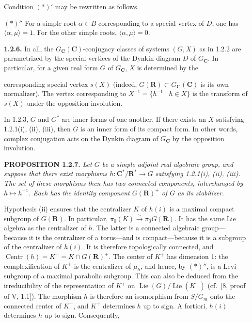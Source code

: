 \documentclass[10pt,a4paper]{article}
\newcommand{\SourcePage}[2]{\clearpage\setcounter{page}{#2}\typeout{D031_SOURCE_PAGE physical=#1 printed=#2}}
\begin{document}
Condition \((*)'\) may be rewritten as follows.

\((*)''\) For a simple root \(\alpha\in B\) corresponding to a special vertex of \(D\), one has \(\langle\alpha,\mu\rangle=1\). For the other simple roots, \(\langle\alpha,\mu\rangle=0\).

\textbf{1.2.6.} In all, the \(G_{\mathbf C}(\mathbf C)\)-conjugacy classes of systems \((G,X)\) as in 1.2.2 are parametrized by the special vertices of the Dynkin diagram \(D\) of \(G_{\mathbf C}\). In particular, for a given real form \(G\) of \(G_{\mathbf C}\), \(X\) is determined by the

\SourcePage{13}{259}
corresponding special vertex \(s(X)\) (indeed, \(G(\mathbf R)\subset G_{\mathbf C}(\mathbf C)\) is its own normalizer). The vertex corresponding to \(X^{-1}=\{h^{-1}\mid h\in X\}\) is the transform of \(s(X)\) under the opposition involution.

In 1.2.3, \(G\) and \(G^*\) are inner forms of one another. If there exists an \(X\) satisfying 1.2.1(i), (ii), (iii), then \(G\) is an inner form of its compact form. In other words, complex conjugation acts on the Dynkin diagram of \(G_{\mathbf C}\) by the opposition involution.

\textbf{PROPOSITION 1.2.7.} \emph{Let \(G\) be a simple adjoint real algebraic group, and suppose that there exist morphisms \(h:\mathbf C^*/\mathbf R^*\to G\) satisfying 1.2.1(i), (ii), (iii). The set of these morphisms then has two connected components, interchanged by \(h\mapsto h^{-1}\). Each has the identity component \(G(\mathbf R)^+\) of \(G\) as its stabilizer.}

Hypothesis (ii) ensures that the centralizer \(K\) of \(h(i)\) is a maximal compact subgroup of \(G(\mathbf R)\). In particular, \(\pi_0(K)\xrightarrow{\sim}\pi_0G(\mathbf R)\). It has the same Lie algebra as the centralizer of \(h\). The latter is a connected algebraic group---because it is the centralizer of a torus---and is compact---because it is a subgroup of the centralizer of \(h(i)\). It is therefore topologically connected, and \(\operatorname{Centr}(h)=K^+=K\cap G(\mathbf R)^+\). The center of \(K^+\) has dimension 1: the complexification of \(K^+\) is the centralizer of \(\mu_h\), and hence, by \((*)''\), is a Levi subgroup of a maximal parabolic subgroup. This can also be deduced from the irreducibility of the representation of \(K^+\) on \(\operatorname{Lie}(G)/\operatorname{Lie}(K^+)\) (cf.~{[}8, proof of V, 1.1{]}). The morphism \(h\) is therefore an isomorphism from \(S/G_m\) onto the connected center of \(K^+\), and \(K^+\) determines \(h\) up to sign. A fortiori, \(h(i)\) determines \(h\) up to sign. Consequently,
\end{document}
